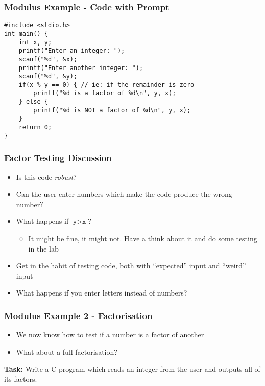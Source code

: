 \documentclass[14pt]{beamer}
\begin{document}
\begin{frame}[fragile]
\frametitle{Modulus Example - Code with Prompt}
\begin{lstlisting}[style=CStyle,caption=\texttt{factorTest.c}]
#include <stdio.h>
int main() {
	int x, y;
	printf("Enter an integer: ");
	scanf("%d", &x);
	printf("Enter another integer: ");
	scanf("%d", &y);
	if(x % y == 0) { // ie: if the remainder is zero
		printf("%d is a factor of %d\n", y, x);
	} else {
		printf("%d is NOT a factor of %d\n", y, x);
	}
	return 0;
}
\end{lstlisting}
\end{frame}

\begin{frame}
\frametitle{Factor Testing Discussion}
\begin{itemize}
\item Is this code \textit{robust}?
\item Can the user enter numbers which make the code produce the wrong number?
\item What happens if $\texttt{y}>\texttt{x}$?
	\begin{itemize}
		\item It might be fine, it might not. Have a think about it and do some testing in the lab
	\end{itemize}
\item Get in the habit of testing code, both with ``expected'' input and ``weird'' input
\item What happens if you enter letters instead of numbers?
\end{itemize}
\end{frame}

\begin{frame}
\frametitle{Modulus Example 2 - Factorisation}
\begin{itemize}
\item We now know how to test if a number is a factor of another
\item What about a full factorisation?
\end{itemize}

\textbf{Task:} Write a C program which reads an integer from the user and outputs all of its factors.
\end{frame}
\end{document}
